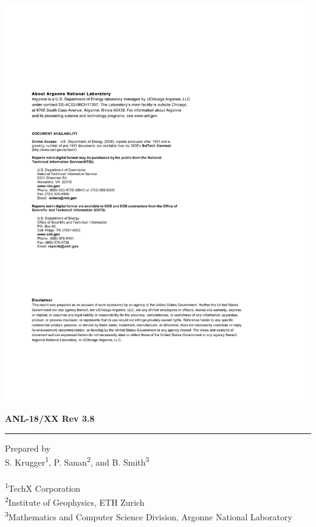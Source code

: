 \vspace*{10pt}
\vspace*{20pt}



\newpage
\centerline{\includegraphics{ArgonneReportTemplatePage2}}
\newpage

\hfill {\large {\bf ANL-18/XX Rev 3.8}}

\vspace*{2in}
\vspace*{8pt}
\hrule
\vspace*{8pt}

\vspace*{0.5in}
\noindent Prepared by \\
{ S. Krugger\textsuperscript{1}, P. Sanan\textsuperscript{2}, and B. Smith\textsuperscript{3}}\\
\\
\textsuperscript{1}TechX Corporation \\
\textsuperscript{2}Institute of Geophysics, ETH Zurich\\
\textsuperscript{3}Mathematics and Computer Science Division, Argonne National Laboratory \\


